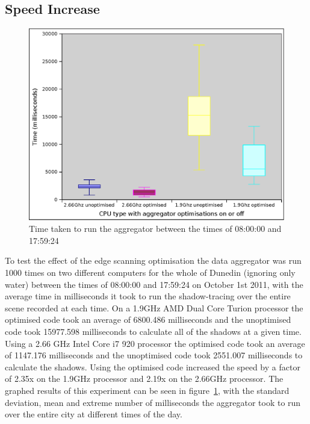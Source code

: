 \documentclass[12pt]{report}
\begin{document}
\subsection{Speed Increase}
\begin{figure}[h]
\centering
\includegraphics[width=\textwidth]{aggregator-optimisations-graph.eps}
\caption{Time taken to run the aggregator between the times of 08:00:00 and 17:59:24}
\label{image:aggregator-optimisations-graph}
\end{figure}

To test the effect of the edge scanning optimisation the data aggregator was run 1000 times on two different computers for the whole of Dunedin (ignoring only water) between the times of 08:00:00 and 17:59:24 on October 1st 2011, with the average time in milliseconds it took to run the shadow-tracing over the entire scene recorded at each time. On a 1.9GHz AMD Dual Core Turion processor the optimised code took an average of 6800.486 milliseconds and the unoptimised code took 15977.598 milliseconds to calculate all of the shadows at a given time. Using a 2.66 GHz Intel Core i7 920 processor the optimised code took an average of 1147.176 milliseconds and the unoptimised code took 2551.007 milliseconds to calculate the shadows. Using the optimised code increased the speed by a factor of 2.35x on the 1.9GHz processor and 2.19x on the 2.66GHz processor. The graphed results of this experiment can be seen in figure~\ref{image:aggregator-optimisations-graph}, with the standard deviation, mean and extreme number of milliseconds the aggregator took to run over the entire city at different times of the day.
\end{document}
